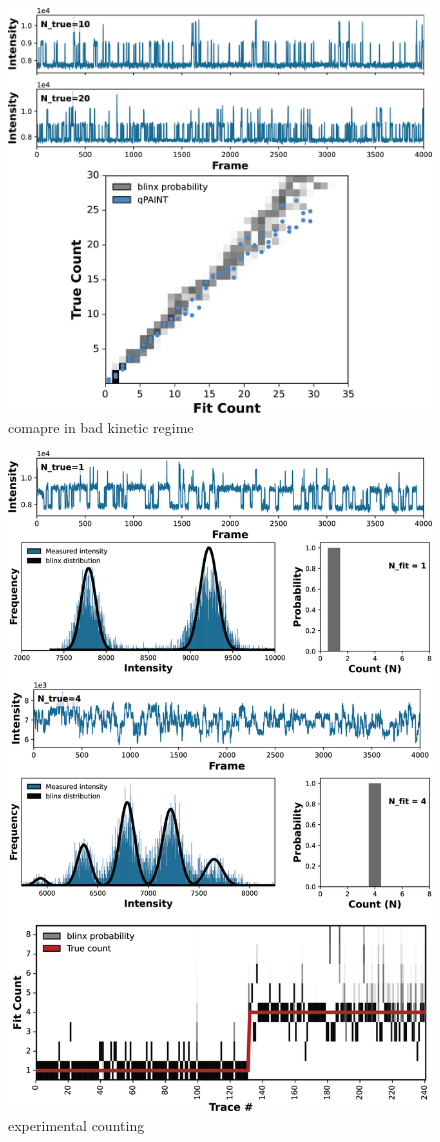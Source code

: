 \documentclass[twocolumn]{article}
\begin{document}
\begin{figure}
  \includegraphics[width=\linewidth]{figures/placeholders/figure_4_qpaint_kinetics.png}
  \caption{comapre in bad kinetic regime}
  \label{fig:method:overview}
\end{figure}

\begin{figure}
  \includegraphics[width=\linewidth]{figures/placeholders/figure_5_experimental_counting.png}
  \caption{experimental counting}
  \label{fig:method:overview}
\end{figure}
\end{document}
